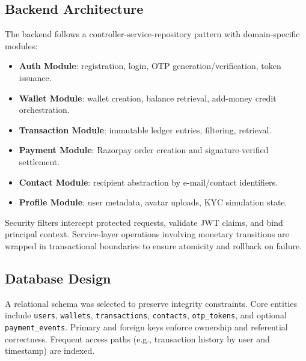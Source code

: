 \documentclass[conference]{IEEEtran}
\begin{document}
\subsection{Backend Architecture}
The backend follows a controller-service-repository pattern with domain-specific modules:
\begin{itemize}
\item \textbf{Auth Module}: registration, login, OTP generation/verification, token issuance.
\item \textbf{Wallet Module}: wallet creation, balance retrieval, add-money credit orchestration.
\item \textbf{Transaction Module}: immutable ledger entries, filtering, retrieval.
\item \textbf{Payment Module}: Razorpay order creation and signature-verified settlement.
\item \textbf{Contact Module}: recipient abstraction by e-mail/contact identifiers.
\item \textbf{Profile Module}: user metadata, avatar uploads, KYC simulation state.
\end{itemize}

Security filters intercept protected requests, validate JWT claims, and bind principal context. Service-layer operations involving monetary transitions are wrapped in transactional boundaries to ensure atomicity and rollback on failure.

\subsection{Database Design}
A relational schema was selected to preserve integrity constraints. Core entities include \texttt{users}, \texttt{wallets}, \texttt{transactions}, \texttt{contacts}, \texttt{otp\_tokens}, and optional \texttt{payment\_events}. Primary and foreign keys enforce ownership and referential correctness. Frequent access paths (e.g., transaction history by user and timestamp) are indexed.
\end{document}
